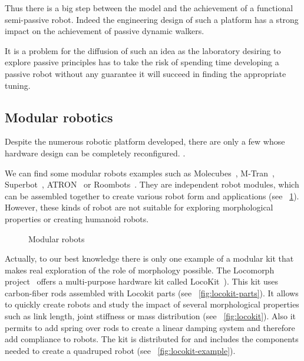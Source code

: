 Thus there is a big step between the model and the achievement of a functional semi-passive robot. Indeed the engineering design of such a platform has a strong impact on the achievement of passive dynamic walkers.

It is a problem for the diffusion of such an idea as the laboratory desiring to explore passive principles has to take the risk of spending time developing a passive robot without any guarantee it will succeed in finding the appropriate tuning.


\subsection{Modular robotics} %

Despite the numerous robotic platform developed, there are only a few whose hardware design can be completely reconfigured. .

We can find some modular robots examples such as Molecubes~\parencite{zykov2007molecubes}, M-Tran~\parencite{murata2002m}, Superbot~\parencite{salemi2006superbot}, ATRON~\parencite{jorgensen2004modular} or Roombots~\parencite{sproewitz2009roombots}. They are independent robot modules, which can be assembled together to create various robot form and applications (see \figurename~\ref{fig:modular-robots}). However, these kinds of robot are not suitable for exploring morphological properties or creating humanoid robots.

\begin{figure}[tb]
\centering
    \hfil
    \caption{Modular robots}
    \label{fig:modular-robots}
\end{figure}

Actually, to our best knowledge there is only one example of a modular kit that makes real exploration of the role of morphology possible. The Locomorph project~\parencite{locomorph} offers a multi-purpose hardware kit called LocoKit~\parencite{larsen2012locokit}). This kit uses carbon-fiber rods assembled with Locokit parts (see \figurename~\ref{fig:locokit-parts}). It allows to quickly create robots and study the impact of several morphological properties such as link length, joint stiffness or mass distribution (see \figurename~\ref{fig:locokit}). Also it permits to add spring over rods to create a linear damping system and therefore add compliance to robots.
The kit is distributed for  and includes the components needed to create a quadruped robot (see \figurename~\ref{fig:locokit-example}).

